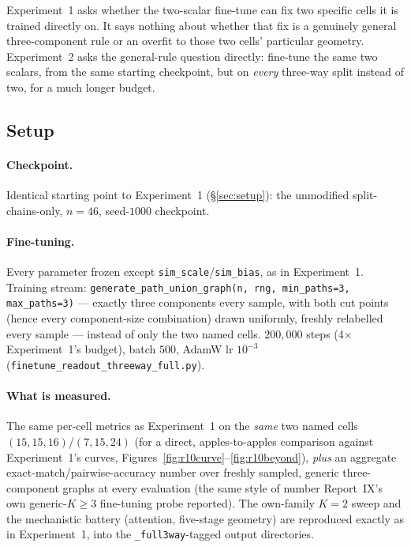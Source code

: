 \documentclass[11pt,a4paper]{article}
\begin{document}
Experiment~1 asks whether the two-scalar fine-tune can fix two specific cells it is trained
directly on. It says nothing about whether that fix is a genuinely general three-component rule
or an overfit to those two cells' particular geometry. Experiment~2 asks the general-rule question
directly: fine-tune the same two scalars, from the same starting checkpoint, but on \emph{every}
three-way split instead of two, for a much longer budget.

\subsection{Setup}
\label{sec:setup-full}

\paragraph{Checkpoint.} Identical starting point to Experiment~1 (\S\ref{sec:setup}): the
unmodified split-chains-only, $n{=}46$, seed-$1000$ checkpoint.

\paragraph{Fine-tuning.} Every parameter frozen except \texttt{sim\_scale}/\texttt{sim\_bias}, as
in Experiment~1. Training stream: \texttt{generate\_path\_union\_graph(n, rng, min\_paths{=}3,
max\_paths{=}3)} --- exactly three components every sample, with both cut points (hence every
component-size combination) drawn uniformly, freshly relabelled every sample --- instead of only
the two named cells. $200{,}000$ steps (4$\times$ Experiment~1's budget), batch $500$, AdamW lr
$10^{-3}$ (\texttt{finetune\_readout\_threeway\_full.py}).

\paragraph{What is measured.} The same per-cell metrics as Experiment~1 on the \emph{same} two
named cells $(15,15,16)$/$(7,15,24)$ (for a direct, apples-to-apples comparison against
Experiment~1's curves, Figures~\ref{fig:r10curve}--\ref{fig:r10beyond}), \emph{plus} an aggregate
exact-match/pairwise-accuracy number over freshly sampled, generic three-component graphs at every
evaluation (the same style of number Report~IX's own generic-$K{\ge}3$ fine-tuning probe
reported). The own-family $K{=}2$ sweep and the mechanistic battery (attention, five-stage
geometry) are reproduced exactly as in Experiment~1, into the \texttt{\_full3way}-tagged output
directories.
\end{document}
